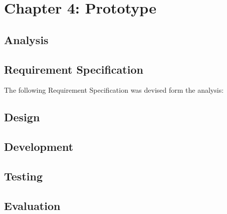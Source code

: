\section{Chapter 4: Prototype}
	\subsection{Analysis}
	\subsection{Requirement Specification}
	The following Requirement Specification was devised form the analysis:
	
	\subsection{Design}
	\pagebreak
	\subsection{Development}
	
	\pagebreak
	\subsection{Testing}
	\pagebreak
	\subsection{Evaluation}

	